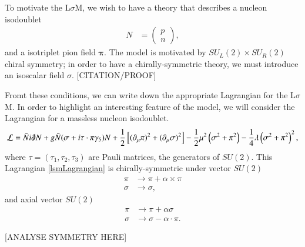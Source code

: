 \documentclass[aps,prd,onecolumn,showpacs,amsmath,amssymb,nofootinbib]{revtex4} \pdfoutput=1
\newcommand{\lsm}{L$\sigma$M}
\newcommand{\groupsu}[1]{S\!U(#1)}
\begin{document}
To motivate the \lsm, we wish to have a theory that describes a nucleon isodoublet 
\begin{align}
    N &= 
        \begin{pmatrix}
          p \\
          n
        \end{pmatrix},
  \end{align}
  and a isotriplet pion field $\mathbf{\pi}$. The model is motivated by ${S\!U}_L(2)\times {S\!U}_R(2)$ chiral symmetry; in order to have a chirally-symmetric theory, we must introduce an isoscalar field $\sigma$. [CITATION/PROOF] 
  
  Fromt these conditions, we can write down the appropriate Lagrangian for the \lsm. In order to highlight an interesting feature of the model, we will consider the Lagrangian for a massless nucleon isodoublet. 
  \begin{equation}
      \label{lsmLagrangian}
      \mathcal{L} = \bar{N}i \slashed{\partial}N + g\bar{N}(\sigma + i \mathbf{\tau \cdot \pi}\gamma_{5})N +\frac{1}{2}\left[(\partial_{\mu}\mathbf{\pi})^{2}+(\partial_{\mu}\mathbf{\sigma})^{2}\right]-\frac{1}{2}\mu^2\left(\sigma^2+\mathbf{\pi}^2\right) - \frac{1}{4}\lambda\left(\sigma^2+\mathbf{\pi}^2\right)^2,
  \end{equation}
  where $\tau = (\tau_1, \tau_2, \tau_3)$ are Pauli matrices, the generators of $\groupsu{2}$.
  This Lagrangian \eqref{lsmLagrangian} is chirally-symmetric under vector $\groupsu{2}$
  \begin{align}
      \pi  & \rightarrow \pi + \alpha \times \pi\\
      \sigma & \rightarrow \sigma,
  \end{align}
  and axial vector $\groupsu{2}$
  \begin{align}
      \pi  & \rightarrow \pi + \alpha\sigma\\
      \sigma & \rightarrow \sigma-\alpha \cdot \pi.
  \end{align}
  
  
  [ANALYSE SYMMETRY HERE]
  
\end{document}
